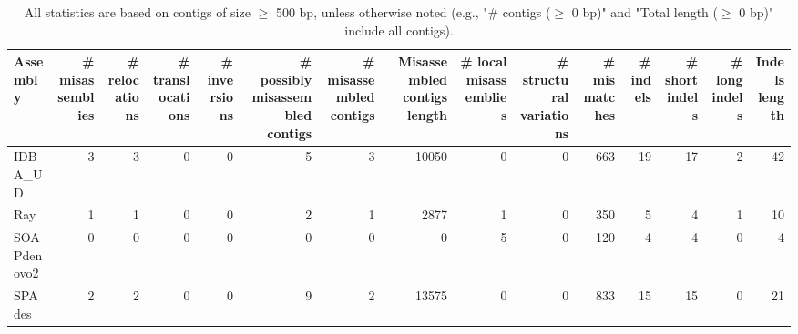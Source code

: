 \documentclass[12pt,a4paper]{article}
\begin{document}
\begin{table}[ht]
\begin{center}
\caption{All statistics are based on contigs of size $\geq$ 500 bp, unless otherwise noted (e.g., "\# contigs ($\geq$ 0 bp)" and "Total length ($\geq$ 0 bp)" include all contigs).}
\begin{tabular}{|l*{14}{|r}|}
\hline
Assembly & \# misassemblies &     \# relocations &     \# translocations &     \# inversions & \# possibly misassembled contigs & \# misassembled contigs & Misassembled contigs length & \# local misassemblies & \# structural variations & \# mismatches & \# indels &     \# short indels &     \# long indels & Indels length \\ \hline
IDBA\_UD & 3 & 3 & 0 & 0 & 5 & 3 & 10050 & 0 & 0 & 663 & 19 & 17 & 2 & 42 \\ \hline
Ray & 1 & 1 & 0 & 0 & 2 & 1 & 2877 & 1 & 0 & 350 & 5 & 4 & 1 & 10 \\ \hline
SOAPdenovo2 & 0 & 0 & 0 & 0 & 0 & 0 & 0 & 5 & 0 & 120 & 4 & 4 & 0 & 4 \\ \hline
SPAdes & 2 & 2 & 0 & 0 & 9 & 2 & 13575 & 0 & 0 & 833 & 15 & 15 & 0 & 21 \\ \hline
\end{tabular}
\end{center}
\end{table}
\end{document}

